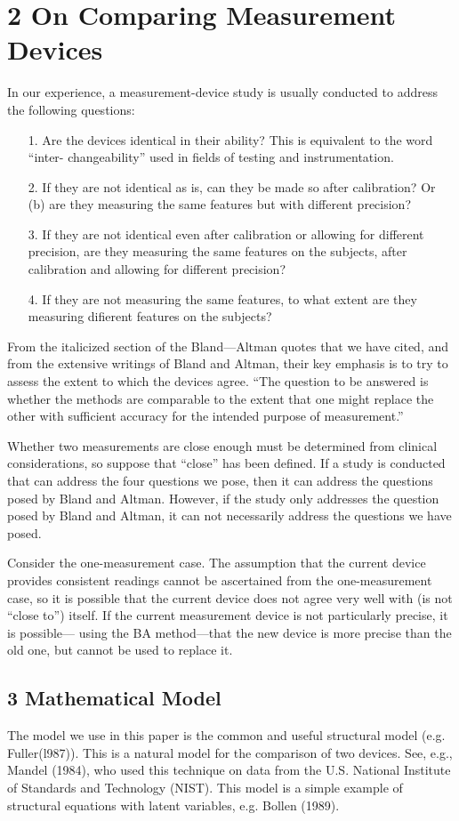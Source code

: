 \documentclass[]{article}
\begin{document}
\section*{2 On Comparing Measurement Devices}
In our experience, a measurement-device study is usually conducted to address the
following questions:
\begin{itemize}
\item[1.] Are the devices identical in their ability? This is equivalent to the word “inter-
changeability” used in ﬁelds of testing and instrumentation.
\item[2.] If they are not identical as is,  can they be made so after calibration? Or (b)
are they measuring the same features but with different precision?
\item[3.] If they are not identical even after calibration or allowing for different precision,
are they measuring the same features on the subjects, after calibration and
allowing for different precision?
\item[4.] If they are not measuring the same features, to what extent are they measuring
diﬁerent features on the subjects?
\end{itemize}
From the italicized section of the Bland—Altman quotes that we have cited, and
from the extensive writings of Bland and Altman, their key emphasis is to try to assess
the extent to which the devices agree. “The question to be answered is whether the
methods are comparable to the extent that one might replace the other with sufficient
accuracy for the intended purpose of measurement.”

Whether two measurements are close enough must be determined from clinical
considerations, so suppose that “close” has been deﬁned. If a study is conducted that
can address the four questions we pose, then it can address the questions posed by
Bland and Altman. However, if the study only addresses the question posed by Bland
and Altman, it can not necessarily address the questions we have posed.

Consider the one-measurement case. The assumption that the current device
provides consistent readings cannot be ascertained from the one-measurement case,
so it is possible that the current device does not agree very well with (is not “close to”)
itself. If the current measurement device is not particularly precise, it is possible—
using the BA method—that the new device is more precise than the old one, but
cannot be used to replace it.

\newpage
\subsection*{3 Mathematical Model}
The model we use in this paper is the common and useful structural model (e.g.
Fuller(l987)). This is a natural model for the comparison of two devices. See, e.g.,
Mandel (1984), who used this technique on data from the U.S. National Institute
of Standards and Technology (NIST). This model is a simple example of structural
equations with latent variables, e.g. Bollen (1989).
\end{document}

